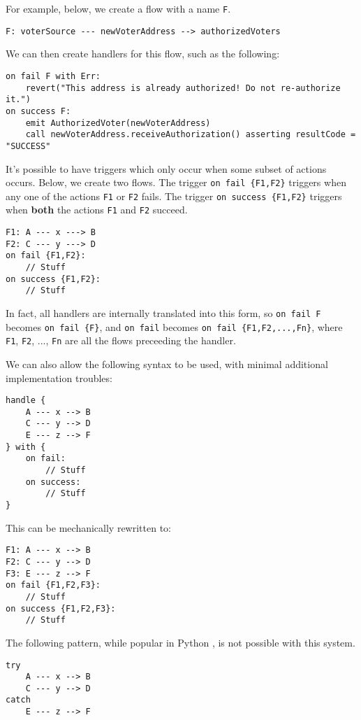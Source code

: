 \documentclass[10pt]{article}
\begin{document}
For example, below, we create a flow with a name \lstinline{F}.
\begin{lstlisting}
F: voterSource --- newVoterAddress --> authorizedVoters
\end{lstlisting}

We can then create handlers for this flow, such as the following:
\begin{lstlisting}
on fail F with Err:
    revert("This address is already authorized! Do not re-authorize it.")
on success F:
    emit AuthorizedVoter(newVoterAddress)
    call newVoterAddress.receiveAuthorization() asserting resultCode = "SUCCESS"
\end{lstlisting}

It's possible to have triggers which only occur when some subset of actions occurs.
Below, we create two flows.
The trigger \lstinline|on fail {F1,F2}| triggers when any one of the actions \lstinline{F1} or \lstinline{F2} fails.
The trigger \lstinline|on success {F1,F2}| triggers when \textbf{both} the actions \lstinline{F1} and \lstinline{F2} succeed.
\begin{lstlisting}
F1: A --- x ---> B
F2: C --- y ---> D
on fail {F1,F2}:
    // Stuff
on success {F1,F2}:
    // Stuff
\end{lstlisting}

In fact, all handlers are internally translated into this form, so \lstinline{on fail F} becomes \lstinline|on fail {F}|, and \lstinline{on fail} becomes \lstinline|on fail {F1,F2,...,Fn}|, where \lstinline{F1}, \lstinline{F2}, ..., \lstinline{Fn} are all the flows preceeding the handler.

We can also allow the following syntax to be used, with minimal additional implementation troubles:
\begin{lstlisting}
handle {
    A --- x --> B
    C --- y --> D
    E --- z --> F
} with {
    on fail:
        // Stuff
    on success:
        // Stuff
}
\end{lstlisting}

This can be mechanically rewritten to:
\begin{lstlisting}
F1: A --- x --> B
F2: C --- y --> D
F3: E --- z --> F
on fail {F1,F2,F3}:
    // Stuff
on success {F1,F2,F3}:
    // Stuff
\end{lstlisting}

The following pattern, while popular in Python , is not possible with this system.
\begin{lstlisting}
try
    A --- x --> B
    C --- y --> D
catch
    E --- z --> F
\end{lstlisting}
\end{document}
